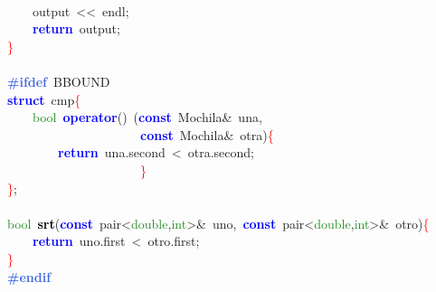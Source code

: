 \mbox{}\ \ \ \  \\
\mbox{}\ \ \ \ output\ \textcolor{BrickRed}{\textless{}\textless{}}\ endl\textcolor{BrickRed}{;} \\
\mbox{}\ \ \ \ \textbf{\textcolor{Blue}{return}}\ output\textcolor{BrickRed}{;} \\
\mbox{}\textcolor{Red}{\}} \\
\mbox{} \\
\mbox{}\textbf{\textcolor{RoyalBlue}{\#ifdef}}\ BBOUND \\
\mbox{}\textbf{\textcolor{Blue}{struct}}\ \textcolor{TealBlue}{cmp}\textcolor{Red}{\{} \\
\mbox{}\ \ \ \ \textcolor{ForestGreen}{bool}\ \textbf{\textcolor{Blue}{operator}}\textcolor{BrickRed}{()}\ \textcolor{BrickRed}{(}\textbf{\textcolor{Blue}{const}}\ Mochila\textcolor{BrickRed}{\&}\ una\textcolor{BrickRed}{,} \\
\mbox{}\ \ \ \ \ \ \ \ \ \ \ \ \ \ \ \ \ \ \ \ \ \textbf{\textcolor{Blue}{const}}\ Mochila\textcolor{BrickRed}{\&}\ otra\textcolor{BrickRed}{)}\textcolor{Red}{\{} \\
\mbox{}\ \ \ \ \ \ \ \ \textbf{\textcolor{Blue}{return}}\ una\textcolor{BrickRed}{.}second\ \textcolor{BrickRed}{\textless{}}\ otra\textcolor{BrickRed}{.}second\textcolor{BrickRed}{;} \\
\mbox{}\ \ \ \ \ \ \ \ \ \ \ \ \ \ \ \ \ \ \ \ \ \textcolor{Red}{\}} \\
\mbox{}\textcolor{Red}{\}}\textcolor{BrickRed}{;} \\
\mbox{} \\
\mbox{}\textcolor{ForestGreen}{bool}\ \textbf{\textcolor{Black}{srt}}\textcolor{BrickRed}{(}\textbf{\textcolor{Blue}{const}}\ pair\textcolor{BrickRed}{\textless{}}\textcolor{ForestGreen}{double}\textcolor{BrickRed}{,}\textcolor{ForestGreen}{int}\textcolor{BrickRed}{\textgreater{}\&}\ uno\textcolor{BrickRed}{,}\ \textbf{\textcolor{Blue}{const}}\ pair\textcolor{BrickRed}{\textless{}}\textcolor{ForestGreen}{double}\textcolor{BrickRed}{,}\textcolor{ForestGreen}{int}\textcolor{BrickRed}{\textgreater{}\&}\ otro\textcolor{BrickRed}{)}\textcolor{Red}{\{} \\
\mbox{}\ \ \ \ \textbf{\textcolor{Blue}{return}}\ uno\textcolor{BrickRed}{.}first\ \textcolor{BrickRed}{\textless{}}\ otro\textcolor{BrickRed}{.}first\textcolor{BrickRed}{;} \\
\mbox{}\textcolor{Red}{\}} \\
\mbox{}\textbf{\textcolor{RoyalBlue}{\#endif}} \\
